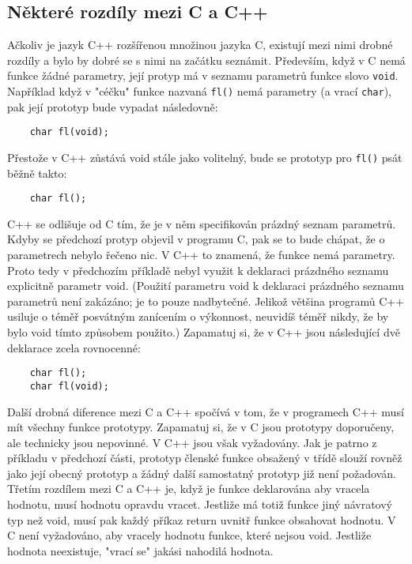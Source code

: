   \subsection{Některé rozdíly mezi C a C++}
    Ačkoliv je jazyk C++ rozšířenou množinou jazyka C, existují mezi nimi drobné rozdíly a bylo by dobré se s nimi na začátku
    seznámit.
    Především, když v C nemá funkce žádné parametry, její protyp má v seznamu parametrů funkce slovo
    \lstinline[basicstyle=\ttfamily]!void!. Například když v "céčku" funkce nazvaná \lstinline[basicstyle=\ttfamily]!fl()! nemá
    parametry (a vrací \lstinline[basicstyle=\ttfamily]!char!), pak její prototyp bude vypadat následovně:
    \begin{lstlisting}
    char fl(void);
    \end{lstlisting}
    Přestože v C++ zůstává void stále jako volitelný, bude se prototyp pro \lstinline[basicstyle=\ttfamily]!fl()! psát běžně
    takto:
    \begin{lstlisting}
    char fl();
    \end{lstlisting}

    C++ se odlišuje od C tím, že je v něm specifikován prázdný seznam parametrů. Kdyby se předchozí protyp objevil v programu C,
    pak se to bude chápat, že o parametrech nebylo řečeno nic. V C++ to znamená, že funkce nemá parametry. Proto tedy v
    předchozím příkladě nebyl využit k deklaraci prázdného seznamu explicitně parametr void. (Použití parametru void k deklaraci
    prázdného seznamu parametrů není zakázáno; je to pouze nadbytečné. Jelikož většina programů C++ usiluje o téměř posvátným
    zanícením o výkonnost, neuvidíš téměř nikdy, že by bylo void tímto způsobem použito.) Zapamatuj si, že v C++ jsou následující
    dvě deklarace zcela rovnocenné:
    \begin{lstlisting}
    char fl();
    char fl(void);
    \end{lstlisting}

    Další drobná diference mezi C a C++ spočívá v tom, že v programech C++ musí mít všechny funkce prototypy. Zapamatuj si, že v
    C jsou prototypy doporučeny, ale technicky jsou nepovinné. V C++ jsou však vyžadovány. Jak je patrno z příkladu v předchozí
    části, prototyp členské funkce obsažený v třídě slouží rovněž jako její obecný prototyp a žádný další samostatný prototyp již
    není požadován.
    Třetím rozdílem mezi C a C++ je, když je funkce deklarována aby vracela hodnotu, musí hodnotu opravdu vracet. Jestliže má
    totiž funkce jiný návratový typ než void, musí pak každý příkaz return uvnitř funkce obsahovat hodnotu. V C není vyžadováno,
    aby vracely hodnotu funkce, které nejsou void. Jestliže hodnota neexistuje, "vrací se" jakási nahodilá hodnota.
 
